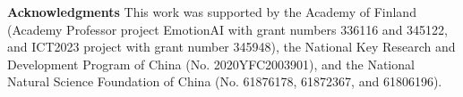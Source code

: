 \documentclass[10pt,journal,compsoc]{IEEEtran}
\begin{document}
\vspace{0.5em}

\noindent\textbf{Acknowledgments} \quad This work was supported by the Academy of Finland (Academy Professor project EmotionAI with grant numbers 336116 and 345122, and ICT2023 project with grant number 345948), the National Key Research and Development Program of China (No. 2020YFC2003901), and the National Natural Science Foundation of China (No. 61876178, 61872367, and 61806196).






\ifCLASSOPTIONcaptionsoff
  \newpage
\fi





%
%
%



% 
\end{document}
